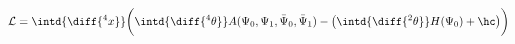 \begin{equation}
  \label{eq:nlnonkahler}
  \mathcal{L} = \intd{\diff{^4x}} \biggl( \intd{\diff{^4 \theta}} A(\Psi_0,\Psi_1 , \bar{\Psi}_0, \bar{\Psi}_1) - \bigl(
  \intd{\diff{^2 \theta}} H(\Psi_0) + \hc \bigr) \biggr)
\end{equation}

